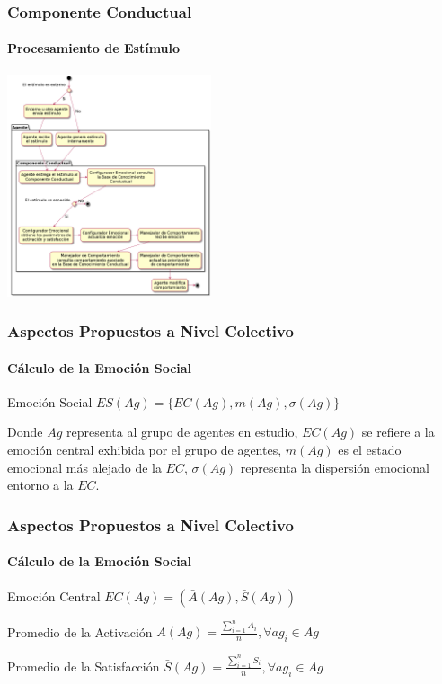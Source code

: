 \documentclass{beamer}
\begin{document}
\begin{frame}
\frametitle{Componente Conductual}
\framesubtitle{Procesamiento de Estímulo}
\centering
\includegraphics[width=6cm]{ilustraciones/procesamiento-estimulo}
\end{frame}

\begin{frame}
\frametitle{Aspectos Propuestos a Nivel Colectivo}
\framesubtitle{Cálculo de la Emoción Social}
\begin{exampleblock}{Emoción Social}
$ES(Ag) = \{EC(Ag), m(Ag), \sigma(Ag)\}$
\end{exampleblock}

Donde $Ag$ representa al grupo de agentes en estudio, $EC(Ag)$ se refiere a la
emoción central exhibida por el grupo de agentes, $m(Ag)$ es el estado emocional
más alejado de la $EC$, $\sigma(Ag)$ representa la dispersión emocional entorno
a la $EC$.
\end{frame}

\begin{frame}
\frametitle{Aspectos Propuestos a Nivel Colectivo}
\framesubtitle{Cálculo de la Emoción Social}
\begin{exampleblock}{Emoción Central}
$EC(Ag) = (\bar A(Ag), \bar S(Ag))$
\end{exampleblock}

\begin{exampleblock}{Promedio de la Activación}
$\bar A(Ag)=\frac{\sum_{i=1}^n A_i}{n}, \forall ag_i \in Ag$ \\
\end{exampleblock}

\begin{exampleblock}{Promedio de la Satisfacción}
$\bar S(Ag)=\frac{\sum_{i=1}^n S_i}{n}, \forall ag_i \in Ag$
\end{exampleblock}

\end{frame}
\end{document}
